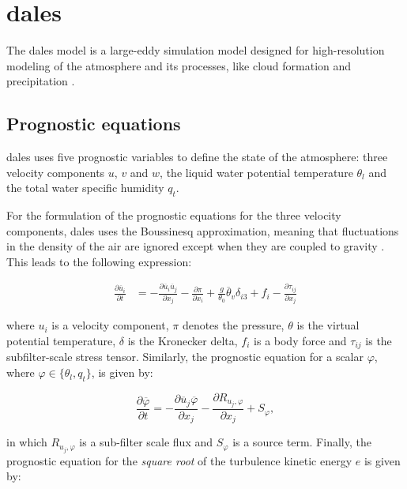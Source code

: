 \section{\acrshort{dales}}
The \acrfull{dales} model is a large-eddy simulation model designed for high-resolution modeling of the atmosphere and its processes, like cloud formation and precipitation \citep{heusFormulationDutchAtmospheric2010,ouwerslootLargeEddySimulationComparison2017}. 

\subsection{Prognostic equations}
\acrshort{dales} uses five prognostic variables to define the state of the atmosphere: three velocity components $u$, $v$ and $w$, the liquid water potential temperature $\theta_l$ and the total water specific humidity $q_t$. 

For the formulation of the prognostic equations for the three velocity components, \acrshort{dales} uses the Boussinesq approximation, meaning that fluctuations in the density of the air are ignored except when they are coupled to gravity \citep{spiegel1960boussinesq}. This leads to the following expression: 

\begin{align}
    \frac{\partial \overline{u}_i}{\partial t} &= - \frac{\partial \overline{u}_i \overline{u}_j}{\partial x_j} - \frac{\partial \pi}{\partial x_i} + \frac{g}{\theta_0}\overline{\theta}_v \delta_{i3} + f_i - \frac{\partial \tau_{ij}}{\partial x_j} \label{eq:momentum_conservation}
\end{align}

where $u_i$ is a velocity component, $\pi$ denotes the pressure, $\theta$ is the virtual potential temperature, $\delta$ is the Kronecker delta, $f_i$ is a body force and $\tau_{ij}$ is the subfilter-scale stress tensor. Similarly, the prognostic equation for a scalar $\varphi$, where $\varphi \in \{\theta_l, q_t\}$, is given by:

\begin{equation}
    \frac{\partial \overline{\varphi}}{\partial t} = - \frac{\partial \overline{u}_j \overline{\varphi}}{\partial x_j} - \frac{\partial R_{u_j,\varphi}}{\partial x_j} + S_\varphi,
\end{equation}

in which $R_{u_j,\varphi}$ is a sub-filter scale flux and $S_\varphi$ is a source term. Finally, the prognostic equation for the \emph{square root} of the turbulence kinetic energy $e$ is given by:

